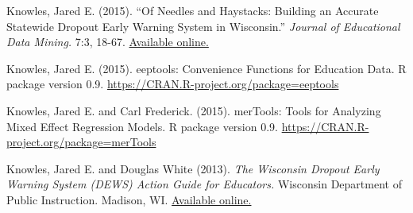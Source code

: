\documentclass[margin,line]{res}
\begin{document}
\begin{resume}

Knowles, Jared E. (2015). ``Of Needles and Haystacks: Building an Accurate Statewide 
Dropout Early Warning System in Wisconsin.'' \emph{Journal of Educational Data 
Mining.} 7:3, 18-67. 
\href{https://www.educationaldatamining.org/JEDM/index.php/JEDM/article/view/JEDM082}{Available online.}

Knowles, Jared E. (2015). eeptools: Convenience Functions for Education Data. R package
  version 0.9. \url{https://CRAN.R-project.org/package=eeptools}

Knowles, Jared E. and Carl Frederick. (2015). merTools: Tools for Analyzing Mixed 
Effect Regression Models. R package version 0.9. 
\url{https://CRAN.R-project.org/package=merTools}

% 


Knowles, Jared E. and Douglas White (2013). \emph{The Wisconsin Dropout Early 
Warning System (DEWS) Action Guide for Educators.} Wisconsin Department of Public 
Instruction. Madison, WI. \href{https://dpi.wi.gov/dews}{Available online.}



% 
% 



\end{resume}
\end{document}
